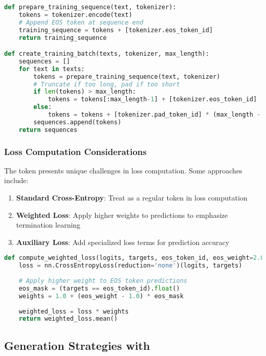 \begin{lstlisting}[language=Python, caption=Training data preparation with \eos{} tokens]
def prepare_training_sequence(text, tokenizer):
    tokens = tokenizer.encode(text)
    # Append EOS token at sequence end
    training_sequence = tokens + [tokenizer.eos_token_id]
    return training_sequence

def create_training_batch(texts, tokenizer, max_length):
    sequences = []
    for text in texts:
        tokens = prepare_training_sequence(text, tokenizer)
        # Truncate if too long, pad if too short
        if len(tokens) > max_length:
            tokens = tokens[:max_length-1] + [tokenizer.eos_token_id]
        else:
            tokens = tokens + [tokenizer.pad_token_id] * (max_length - len(tokens))
        sequences.append(tokens)
    return sequences
\end{lstlisting}

\subsubsection{Loss Computation Considerations}

The \eos{} token presents unique challenges in loss computation. Some approaches include:

\begin{enumerate}
\item \textbf{Standard Cross-Entropy}: Treat \eos{} as a regular token in loss computation
\item \textbf{Weighted Loss}: Apply higher weights to \eos{} predictions to emphasize termination learning
\item \textbf{Auxiliary Loss}: Add specialized loss terms for \eos{} prediction accuracy
\end{enumerate}

\begin{lstlisting}[language=Python, caption=Weighted loss for \eos{} token training]
def compute_weighted_loss(logits, targets, eos_token_id, eos_weight=2.0):
    loss = nn.CrossEntropyLoss(reduction='none')(logits, targets)
    
    # Apply higher weight to EOS token predictions
    eos_mask = (targets == eos_token_id).float()
    weights = 1.0 + (eos_weight - 1.0) * eos_mask
    
    weighted_loss = loss * weights
    return weighted_loss.mean()
\end{lstlisting}

\subsection{Generation Strategies with \eos{}}


